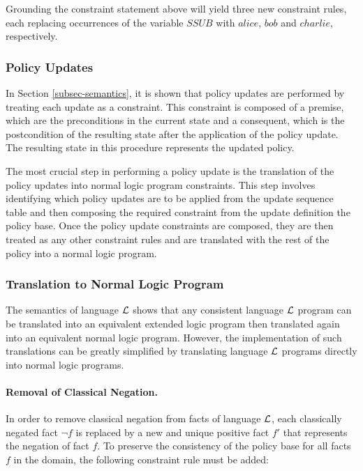 \documentclass[global,twocolumn,final]{svjour}
\begin{document}
        Grounding the constraint statement above will yield three new
        constraint rules, each replacing occurrences of the variable $SSUB$
        with $alice$, $bob$ and $charlie$, respectively.

      \subsubsection{Policy Updates}

        In Section \ref{subsec-semantics}, it is shown that policy updates are
        performed by treating each update as a constraint. This constraint is
        composed of a premise, which are the preconditions in the current state
        and a consequent, which is the postcondition of the resulting state
        after the application of the policy update. The resulting state in this
        procedure represents the updated policy.

        The most crucial step in performing a policy update is the translation
        of the policy updates into normal logic program constraints. This step
        involves identifying which policy updates are to be applied from the
        update sequence table and then composing the required constraint from
        the update definition the policy base. Once the policy update
        constraints are composed, they are then treated as any other
        constraint rules and are translated with the rest of the policy into
        a normal logic program.

      \subsubsection{Translation to Normal Logic Program}

        The semantics of language ${\cal L}$ shows that any consistent language
        ${\cal L}$ program can be translated into an equivalent extended logic
        program then translated again into an equivalent normal logic program.
        However, the implementation of such translations can be greatly
        simplified by translating language ${\cal L}$ programs directly into
        normal logic programs.

        \paragraph{Removal of Classical Negation.}

          In order to remove classical negation from facts of language
          ${\cal L}$, each classically negated fact $\lnot$$f$ is replaced by
          a new and unique positive fact $f'$ that represents the negation of
          fact $f$. To preserve the consistency of the policy base for all
          facts $f$ in the domain, the following constraint rule must be added:
\end{document}
